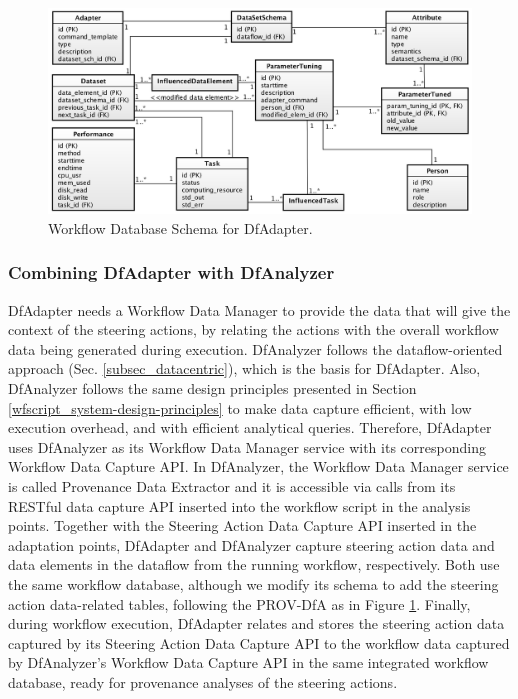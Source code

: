 \begin{figure}[H]
    \centering
    \includegraphics[width=\textwidth,keepaspectratio]{img/DB-Schema-ParameterTuning.png}
    \caption{Workflow Database Schema for DfAdapter.}
    \label{fig:dfadapter_wfdbschema}
\end{figure}

\subsubsection{Combining DfAdapter with DfAnalyzer}
\label{dfanalyzer_dfadapter}

DfAdapter needs a Workflow Data Manager to provide the
data that will give the context of the steering actions, by relating the actions with the overall workflow data being generated during execution.
DfAnalyzer \cite{Silva2017Raw,Camata2018In,silva_dfanalyzer:_2018} follows the dataflow-oriented approach (Sec. \ref{subsec_datacentric}), which is the basis for DfAdapter.
Also, DfAnalyzer follows the same design principles presented in Section \ref{wfscript_system-design-principles} to make data capture efficient, with low execution overhead, and with efficient analytical queries.
Therefore, DfAdapter uses DfAnalyzer as its Workflow Data Manager service with its corresponding Workflow Data Capture API.
In DfAnalyzer, the Workflow Data Manager service is called Provenance Data Extractor and it is accessible via calls from its RESTful data capture API inserted into the workflow script in the analysis points.
Together with the Steering Action Data Capture API inserted in the adaptation points, DfAdapter and DfAnalyzer capture steering action data and data elements in the dataflow from the running workflow, respectively.
Both use the same workflow database, although we modify its schema to add the steering action data-related tables, following the PROV-DfA as in Figure \ref{fig:dfadapter_wfdbschema}.
Finally, during workflow execution, DfAdapter relates and stores the steering action data captured by its Steering Action Data Capture API to the workflow data captured by DfAnalyzer's Workflow Data Capture API in the same integrated workflow database, ready for provenance analyses of the steering actions.



